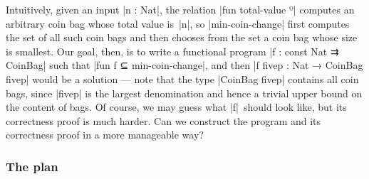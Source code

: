 Intuitively, given an input |n : Nat|, the relation |fun total-value º| computes an arbitrary coin bag whose total value is~|n|, so |min-coin-change| first computes the set of all such coin bags and then chooses from the set a coin bag whose size is smallest.
Our goal, then, is to write a functional program |f : const Nat ⇉ CoinBag| such that |fun f ⊆ min-coin-change|, and then |f fivep : Nat → CoinBag fivep| would be a solution --- note that the type |CoinBag fivep| contains all coin bags, since |fivep| is the largest denomination and hence a trivial upper bound on the content of bags.
Of course, we may guess what |f|~should look like, but its correctness proof is much harder.
Can we construct the program and its correctness proof in a more manageable way?

\subsubsection{The plan}

